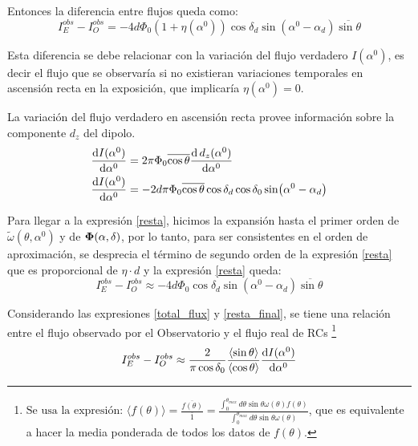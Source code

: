      Entonces la diferencia entre flujos queda como:
    \begin{equation}
        I^{obs}_E -  I^{obs}_O =-4d \Phi_0 (1+ \eta(\alpha^0)) \cos\delta_d \sin(\alpha^0  - \alpha_d)\overline{\sin\theta}
        \label{resta}
    \end{equation}

    Esta diferencia se debe relacionar con la variación del flujo verdadero $I(\alpha^0)$, es decir el flujo que se observaría si no existieran variaciones temporales en ascensión recta en la exposición, que implicaría $\eta(\alpha^0)=0$. 

    La variación del flujo verdadero en ascensión recta provee información sobre la componente $d_z$ del dipolo. 
    \begin{align}
        \dv{I(\alpha^0)}{\alpha^0}  & = 2\pi\Phi_0 \overline{\cos\theta} \dv{\,d_z(\alpha^0) }{\alpha^0}\\ 
        \dv{I(\alpha^0)}{\alpha^0} &= -2d\pi\Phi_0 \overline{\cos\theta}\cos\delta_d \cos\delta_0 \sin(\alpha^0 - \alpha_d) \label{total_flux}
    \end{align}

    Para llegar a la expresión \ref{resta}, hicimos la expansión hasta el primer orden de $\tilde{\omega}(\theta, \alpha^0)$ y de $\bf\Phi(\alpha, \delta)$, por lo tanto, para ser consistentes en el orden de aproximación, se desprecia el término de segundo orden de la expresión \ref{resta} que es proporcional de $\eta \cdot d$ y la expresión \ref{resta} queda:
        \begin{equation}
            I^{obs}_E -  I^{obs}_O \approx -4d \Phi_0 \cos\delta_d \sin(\alpha^0  - \alpha_d)\overline{\sin\theta}
            \label{resta_final}
        \end{equation}

    Considerando las expresiones \ref{total_flux} y \ref{resta_final}, se tiene una relación entre el flujo observado por el Observatorio  y el flujo real de RCs \footnote{
    $
        \text{Se usa la expresión:  }
        \langle f(\theta) \rangle = \frac{\overline{f(\theta)}}{\overline{1}} = \displaystyle\frac{\int_{0}^{\theta_{max}} d \theta \sin\theta \omega(\theta) f(\theta) }{\int_{0}^{\theta_{max}} d \theta \sin\theta \omega(\theta)} 
    $,  
    que es equivalente a hacer la media ponderada de todos los datos de $f(\theta)$.} %
    \begin{equation}
        I^{obs}_E -  I^{obs}_O \approx  \frac{2}{\pi \cos \delta_0} \frac{\langle\sin\theta \rangle}{\langle\cos\theta \rangle}\dv{I(\alpha^0)}{\alpha^0} 
        \label{eq:final}
    \end{equation}
   


